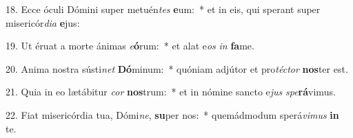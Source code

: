 18. Ecce óculi Dómini super metuén\textit{tes} \textbf{e}um:~*  et in eis, qui sperant super misericór\textit{di}\textit{a} \textbf{e}jus:\

19. Ut éruat a morte ánimas \textit{e}\textbf{ó}rum:~*  et alat e\textit{os} \textit{in} \textbf{fa}me.\

20. Anima nostra sústi\textit{net} \textbf{Dó}minum:~*  quóniam adjútor et pro\textit{téc}\textit{tor} \textbf{nos}ter est.\

21. Quia in eo lætábitur \textit{cor} \textbf{nos}trum:~*  et in nómine sancto e\textit{jus} \textit{spe}\textbf{rá}vimus.\

22. Fiat misericórdia tua, Dómi\textit{ne}, \textbf{su}per nos:~*  quemádmodum sperá\textit{vi}\textit{mus} \textbf{in} te.\

